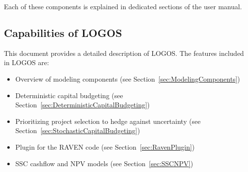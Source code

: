 Each of these components is explained in dedicated sections of the user manual.

\subsection{Capabilities of LOGOS}
This document provides a detailed description of LOGOS. The features included in LOGOS are:
\begin{itemize}
  \item Overview of modeling components (see Section~\ref{sec:ModelingComponents})
	\item Deterministic capital budgeting (see Section~\ref{sec:DeterministicCapitalBudgeting})
	\item Prioritizing project selection to hedge against uncertainty (see Section~\ref{sec:StochasticCapitalBudgeting})
	\item Plugin for the RAVEN code (see Section~\ref{sec:RavenPlugin})
	\item SSC cashflow and NPV models (see Section~\ref{sec:SSCNPV})
\end{itemize}
